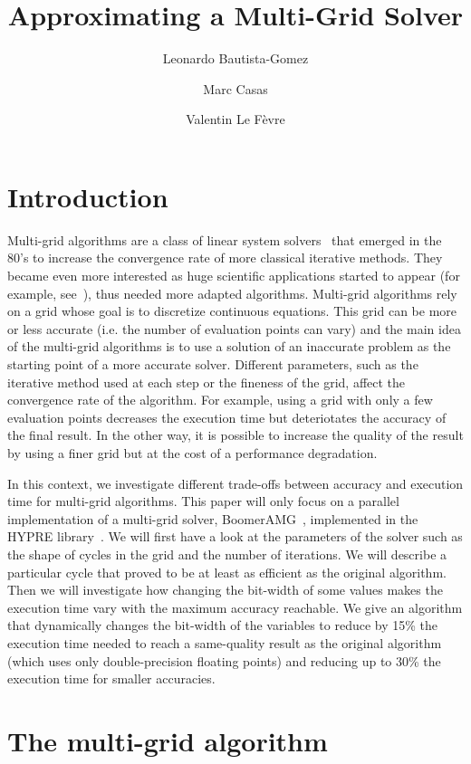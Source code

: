 \documentclass[sigplan]{acmart}
\title{Approximating a Multi-Grid Solver}
\author{Leonardo Bautista-Gomez}
\affiliation{%
  \institution{Barcelona Supercomputing Center}
  \country{Spain}
}
\author{Marc Casas}
\affiliation{%
  \institution{Barcelona Supercomputing Center}
  \country{Spain}
}
\author{Valentin Le Fèvre}
\affiliation{%
\institution{ENS de Lyon}
\country{France}}
\affiliation{%
  \institution{Barcelona Supercomputing Center}
  \country{Spain}
}
\begin{document}
\maketitle

\section{Introduction}

Multi-grid algorithms are a class of linear system solvers~\cite{Hackbusch1991} that emerged in the 80's to increase the convergence rate of more classical iterative methods. They became even more
interested as huge scientific applications started to appear (for example, see~\cite{Ashby1996}), thus needed more adapted algorithms. Multi-grid algorithms rely on a grid whose goal is to discretize continuous equations.
This grid can be more or less accurate (i.e.
the number of evaluation points can vary) and the main idea of the multi-grid algorithms is to use a solution of an inaccurate problem as the starting point of a more accurate solver.
Different parameters, such as the iterative method used at each step or the fineness of the grid, affect the convergence rate of the algorithm. For example, using a grid with only a few
evaluation points decreases the execution time but deteriotates the accuracy of the final result. In the other way, it is possible to increase the quality of the result by using a finer
grid but at the cost of a performance degradation.

In this context, we investigate different trade-offs between accuracy and execution time for multi-grid algorithms. This paper will only focus on a parallel implementation of a multi-grid solver,
BoomerAMG~\cite{boomerAMG}, implemented in the HYPRE library~\cite{Falgout2002}. We will first have a look at the parameters of the solver such as the shape of cycles in the grid and the
number of iterations. We will describe a particular cycle that proved to be at least as efficient as the original algorithm. Then we will investigate how changing the bit-width of
some values makes the execution time vary with the maximum accuracy reachable. We give an algorithm that dynamically changes the bit-width of the variables to reduce by 15\% the execution
time needed to reach a same-quality result as the original algorithm (which uses only double-precision floating points) and reducing up to 30\% the execution time for smaller accuracies.

\section{The multi-grid algorithm}
\end{document}
